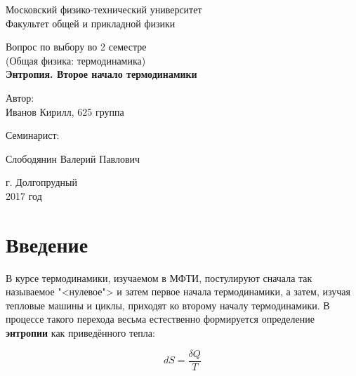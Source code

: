 \documentclass[12pt]{kiarticle}
\newcommand{\del}{\ensuremath{\delta}}
\begin{document}
\begin{titlepage}
	\begin{center}
		\large 	Московский физико-технический университет \\
		Факультет общей и прикладной физики \\
		\vspace{0.2cm}
		
		\vspace{4.5cm}
		Вопрос по выбору во 2 семестре \\ \vspace{0.2cm}
		\large (Общая физика: термодинамика) \\ \vspace{0.2cm}
		\LARGE \textbf{Энтропия. Второе начало термодинамики}
	\end{center}
	\vspace{2.3cm} \large
	
	\begin{center}
		Автор: \\
		Иванов Кирилл,
		625 группа
		\vspace{10mm}
		
		Семинарист: 
		
		Слободянин Валерий Павлович
		
		
	\end{center}
	
	\begin{center} \vspace{50mm}
		г. Долгопрудный \\
		 2017 год
	\end{center}
\end{titlepage}


\section{Введение}

В курсе термодинамики, изучаемом в МФТИ, постулируют сначала так называемое "<нулевое"> и затем первое начала термодинамики, а затем, изучая тепловые машины и циклы, приходят ко второму началу термодинамики. В процессе такого перехода весьма естественно формируется определение \textbf{энтропии} как приведённого тепла: 

\begin{equation}\label{entmipt}
 dS = \dfrac{\del Q}{T}
\end{equation}
\end{document}
